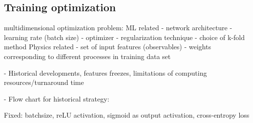 


\subsection{Training optimization}

multidimensional optimization problem:
ML related
- network architecture
- learning rate (batch size)
- optimizer
- regularization technique
- choice of k-fold method
Physics related
- set of input features (observables)
- weights corresponding to different processes in training data set



- Historical developments, features freezes, limitations of computing resources/turnaround time

- Flow chart for historical strategy:

Fixed: batchsize, reLU activation, sigmoid as output activation, cross-entropy loss

